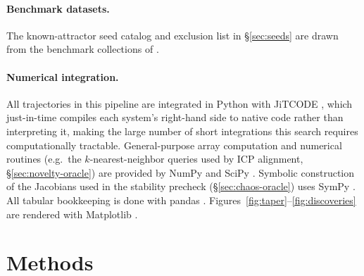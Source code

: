 \documentclass[11pt]{article}
\begin{document}
\paragraph{Benchmark datasets.} The known-attractor seed catalog and exclusion
list in \S\ref{sec:seeds} are drawn from the benchmark collections of
\citet{gilpin2021chaos,gilpin2023model}.

\paragraph{Numerical integration.} All trajectories in this pipeline are
integrated in Python with JiTCODE \citep{ansmann2018efficiently}, which just-in-time compiles each system's right-hand side to native code rather than
interpreting it, making the large number of short integrations this search
requires computationally tractable. General-purpose array computation and
numerical routines (e.g.\ the $k$-nearest-neighbor queries used by ICP
alignment, \S\ref{sec:novelty-oracle}) are provided by NumPy
\citep{harris2020numpy} and SciPy \citep{virtanen2020scipy}. Symbolic
construction of the Jacobians used in the stability precheck
(\S\ref{sec:chaos-oracle}) uses SymPy \citep{meurer2017sympy}. All tabular
bookkeeping is done with pandas \citep{mckinney2010data}.
Figures~\ref{fig:taper}--\ref{fig:discoveries} are rendered with Matplotlib
\citep{hunter2007matplotlib}.

\section{Methods}
\label{sec:methods}
\end{document}
